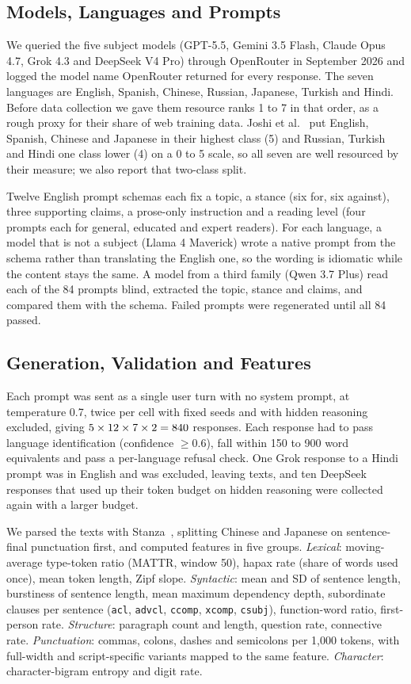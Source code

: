 \documentclass[conference,compsoc]{IEEEtran}
\begin{document}
\subsection{Models, Languages and Prompts}
We queried the five subject models (GPT-5.5, Gemini 3.5 Flash, Claude Opus 4.7, Grok 4.3 and DeepSeek V4 Pro) through OpenRouter in September 2026 and logged the model name OpenRouter returned for every response. The seven languages are English, Spanish, Chinese, Russian, Japanese, Turkish and Hindi. Before data collection we gave them resource ranks 1 to 7 in that order, as a rough proxy for their share of web training data. Joshi et al.~\cite{joshi2020state} put English, Spanish, Chinese and Japanese in their highest class (5) and Russian, Turkish and Hindi one class lower (4) on a 0 to 5 scale, so all seven are well resourced by their measure; we also report that two-class split.

Twelve English prompt schemas each fix a topic, a stance (six for, six against), three supporting claims, a prose-only instruction and a reading level (four prompts each for general, educated and expert readers). For each language, a model that is not a subject (Llama 4 Maverick) wrote a native prompt from the schema rather than translating the English one, so the wording is idiomatic while the content stays the same. A model from a third family (Qwen 3.7 Plus) read each of the 84 prompts blind, extracted the topic, stance and claims, and compared them with the schema. Failed prompts were regenerated until all 84 passed.

\subsection{Generation, Validation and Features}
Each prompt was sent as a single user turn with no system prompt, at temperature 0.7, twice per cell with fixed seeds and with hidden reasoning excluded, giving $5 \times 12{} \times 7 \times 2 = 840{}$ responses. Each response had to pass language identification (confidence $\geq 0.6$), fall within 150 to 900 word equivalents and pass a per-language refusal check. One Grok response to a Hindi prompt was in English and was excluded, leaving \NResponses{} texts, and ten DeepSeek responses that used up their token budget on hidden reasoning were collected again with a larger budget.

We parsed the texts with Stanza~\cite{qi2020stanza}, splitting Chinese and Japanese on sentence-final punctuation first, and computed \NFeatures{} features in five groups. \emph{Lexical}: moving-average type-token ratio (MATTR, window 50), hapax rate (share of words used once), mean token length, Zipf slope. \emph{Syntactic}: mean and SD of sentence length, burstiness of sentence length, mean maximum dependency depth, subordinate clauses per sentence (\texttt{acl}, \texttt{advcl}, \texttt{ccomp}, \texttt{xcomp}, \texttt{csubj}), function-word ratio, first-person rate. \emph{Structure}: paragraph count and length, question rate, connective rate. \emph{Punctuation}: commas, colons, dashes and semicolons per 1,000 tokens, with full-width and script-specific variants mapped to the same feature. \emph{Character}: character-bigram entropy and digit rate.
\end{document}
